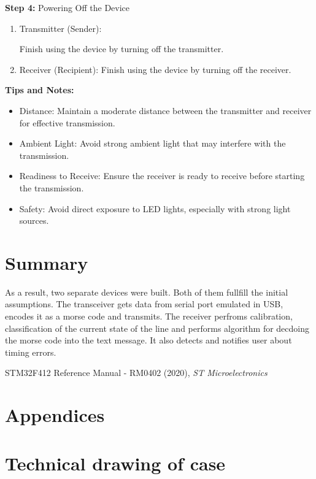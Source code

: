 \documentclass[12pt]{article}
\begin{document}
\noindent\textbf{Step 4:} Powering Off the Device
\begin{enumerate}
  \item Transmitter (Sender):

Finish using the device by turning off the transmitter.

\item Receiver (Recipient):
Finish using the device by turning off the receiver.

\end{enumerate}
\textbf{Tips and Notes:}
\begin{itemize}
  \item Distance: Maintain a moderate distance between the transmitter and receiver for effective transmission.

  \item Ambient Light: Avoid strong ambient light that may interfere with the transmission.

  \item Readiness to Receive: Ensure the receiver is ready to receive before starting the transmission.

  \item Safety: Avoid direct exposure to LED lights, especially with strong light sources.
\end{itemize}
	
	\section{Summary}
  As a result, two separate devices were built. Both of them fullfill the initial assumptions.
  The transceiver gets data from serial port emulated in USB, encodes it as a morse code and transmits.
  The receiver perfroms calibration, classification of the current state of the line and performs algorithm for decdoing the morse code into the text message. It also detects and notifies user about timing errors.
	
	\begin{thebibliography}{9}
     STM32F412 Reference Manual - RM0402 (2020), \emph{ST Microelectronics}
	\end{thebibliography}
	

  \section*{Appendices}
	\appendix
	\section{Technical drawing of case}
\end{document}
